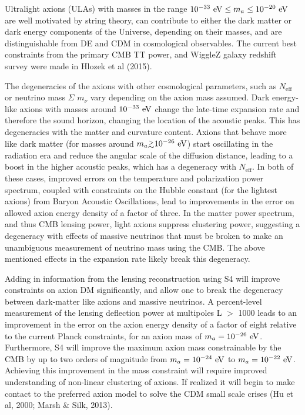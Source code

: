 Ultralight axions (ULAs) with masses in the range $10^{-33}~{\rm eV}\leq m_{a}\leq 10^{-20}~{\rm eV}$ are well motivated by string theory, can contribute to either the dark matter or dark energy components of the Universe, depending on their masses, and are distinguishable from DE and CDM in cosmological observables. The current best constraints from the primary CMB TT power, and WiggleZ galaxy redshift survey were made in Hlozek et al (2015).

The degeneracies of the axions with other cosmological parameters, such as $N_{\mathrm{eff}}$ or neutrino mass $\Sigma$ $m_{\nu}$ vary depending on the axion mass assumed. Dark energy-like axions with masses around $10^{-33}~{\rm eV}$ change the late-time expansion rate and therefore the sound horizon, changing the location of the acoustic peaks. This has degeneracies with the matter and curvature content.
 Axions that behave more like dark matter (for masses around $m_a \gtrsim 10^{-26}~{\rm eV}$) start oscillating in the radiation era and reduce the angular scale of the diffusion distance, leading to a boost in the higher acoustic peaks, which has a degeneracy with $N_\mathrm{eff}$.
 In both of these cases, improved errors on the temperature and polarization power spectrum, coupled with constraints on the Hubble constant (for the lightest axions) from Baryon Acoustic Oscillations, lead to improvements in the error on allowed axion energy density of a factor of three.
In the matter power spectrum, and thus CMB lensing power, light axions suppress clustering power, suggesting a degeneracy with effects of massive neutrinos that must be broken to make an unambiguous measurement of neutrino mass using the CMB. The above mentioned effects in the expansion rate likely break this degeneracy.
 
 Adding in information from the lensing reconstruction using S4 will improve constraints on axion DM significantly, and allow one to break the degeneracy between dark-matter like axions and massive neutrinos. A percent-level measurement of the lensing deflection power at multipoles L $\gt$ 1000 leads to an improvement in the error on the axion energy density of a factor of eight relative to the current Planck constraints, for an axion mass of $m_a=10^{-26}~{\rm eV}$. Furthermore, S4 will improve the maximum axion mass constrainable by the CMB by up to two orders of magnitude from $m_a=10^{-24}~{\rm eV}$ to $m_a=10^{-22}~{\rm eV}$. Achieving this improvement in the mass constraint will require improved understanding of non-linear clustering of axions. If realized it will begin to make contact to the preferred axion model to solve the CDM small scale crises (Hu et al, 2000; Marsh \& Silk, 2013).


%



